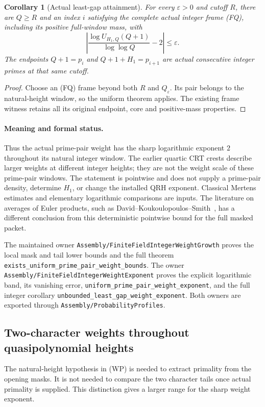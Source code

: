 \documentclass[11pt]{article}
\newtheorem{corollary}[theorem]{Corollary}
\begin{document}
\begin{corollary}[Actual least-gap attainment]
\label{cor:least-gap-two-power-weight}
For every \(\varepsilon>0\) and cutoff \(R\), there are
\(Q\geq R\) and an index \(i\) satisfying the complete actual
integer frame (FQ), including its positive full-window mass, with
\[
 \left|\frac{\log U_{H_1,Q}(Q+1)}{\log\log Q}-2\right|
                \leq\varepsilon .
\]
The endpoints \(Q+1=p_i\) and \(Q+1+H_1=p_{i+1}\) are actual
consecutive integer primes at that same cutoff.
\end{corollary}
\begin{proof}
Choose an (FQ) frame beyond both \(R\) and
\(Q_\varepsilon\). Its pair belongs to the natural-height window,
so the uniform theorem applies. The existing frame witness retains
all its original endpoint, core and positive-mass properties.
\end{proof}

\paragraph{Meaning and formal status.}
Thus the actual prime-pair weight has the sharp logarithmic
exponent \(2\) throughout its natural integer window. The earlier
quartic CRT crests describe larger weights at different integer
heights; they are not the weight scale of these prime-pair windows.
The statement is pointwise and does not supply a prime-pair density,
determine \(H_1\), or change the installed QRH exponent.
Classical Mertens estimates and elementary logarithmic comparisons
are inputs. The literature on averages of Euler products, such as
David--Koukoulopoulos--Smith~\cite{DavidKoukoulopoulosSmith},
has a different conclusion from this deterministic pointwise
bound for the full masked packet.

The maintained owner
\texttt{Assembly/FiniteFieldIntegerWeightGrowth}
proves the local mask and tail lower bounds and the full theorem
\texttt{exists\_uniform\_prime\_pair\_weight\_bounds}.
The owner
\texttt{Assembly/FiniteFieldIntegerWeightExponent}
proves the explicit logarithmic band, its vanishing error,
\texttt{uniform\_prime\_pair\_weight\_exponent}, and the full
integer corollary
\texttt{unbounded\_least\_gap\_weight\_exponent}.
Both owners are exported through
\texttt{Assembly/ProbabilityProfiles}.

\subsection{Two-character weights throughout quasipolynomial heights}
The natural-height hypothesis in (WP) is needed to extract
primality from the opening masks. It is not needed to compare the
two character tails once actual primality is supplied. This
distinction gives a larger range for the sharp weight exponent.
\end{document}

